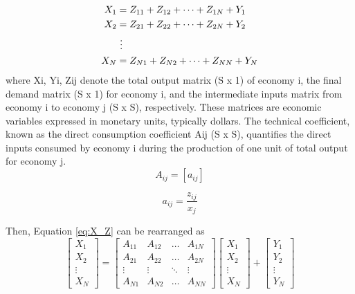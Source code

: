 \begin{align}
X_1 &= Z_{11} + Z_{12} + \cdots + Z_{1N} + Y_1 \notag \\
X_2 &= Z_{21} + Z_{22} + \cdots + Z_{2N} + Y_2 \notag \\
&\ \vdots \notag \\
X_N &= Z_{N1} + Z_{N2} + \cdots + Z_{NN} + Y_N
\label{eq:X_Z}
\end{align}
where Xi, Yi, Zij denote the total output matrix (S x 1) of economy i, the final demand matrix (S x 1) for economy i, and the intermediate inputs matrix from economy i to economy j (S x S), respectively. These matrices are economic variables expressed in monetary units, typically dollars.
The technical coefficient, known as the direct consumption coefficient Aij (S x S), quantifies the direct inputs consumed by economy i during the production of one unit of total output for economy j.
\begin{equation}
A_{ij} = \left[a_{ij}\right]
\label{eq:A}
\end{equation}

\begin{equation}
a_{ij} = \frac{z_{ij}}{x_{j}}
\label{eq:a}
\end{equation}

Then, Equation \eqref{eq:X_Z} can be rearranged as
\begin{equation}
\begin{bmatrix}
X_1 \\
X_2 \\
\vdots \\
X_N
\end{bmatrix} =
\begin{bmatrix}
A_{11} & A_{12} & \dots & A_{1N} \\
A_{21} & A_{22} & \dots & A_{2N} \\
\vdots & \vdots & \ddots & \vdots \\
A_{N1} & A_{N2} & \dots & A_{NN}

\end{bmatrix}
\begin{bmatrix}
X_1 \\
X_2 \\
\vdots \\
X_N
\end{bmatrix} +
\begin{bmatrix}
Y_1 \\
Y_2 \\
\vdots \\
Y_N
\end{bmatrix}
\label{eq:X_original}
\end{equation}

